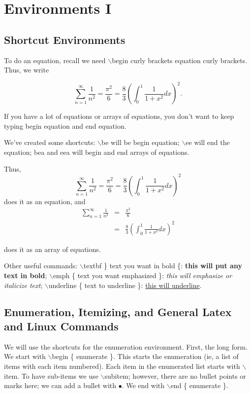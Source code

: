 \documentclass[12pt,reqno]{amsart}
\newcommand\be{\begin{equation}}
\newcommand\ee{\end{equation}}
\newcommand\bea{\begin{eqnarray}}
\newcommand\eea{\end{eqnarray}}
\numberwithin{equation}{section}
\begin{document}
\section{Environments I}

\subsection{Shortcut Environments}

To do an equation, recall we need $\backslash$begin curly brackets
equation curly brackets. Thus, we write

\begin{equation}
\sum_{n=1}^\infty \frac{1}{n^2} = \frac{\pi^2}{6} = \frac{8}{3}
\left(\int_0^1 \frac{1}{1+x^2}dx\right)^2. \end{equation}

If you have a lot of equations or arrays of equations, you don't
want to keep typing begin equation and end equation.

We've created some shortcuts: $\backslash$be will be begin
equation; $\backslash$ee will end the equation; bea and eea will
begin and end arrays of equations.

Thus, \be\sum_{n=1}^\infty \frac{1}{n^2} = \frac{\pi^2}{6} =
\frac{8}{3} \left(\int_0^1 \frac{1}{1+x^2}dx\right)^2  \ee does it
as an equation, and \bea \sum_{n=1}^\infty \frac{1}{n^2} &=&
\frac{\pi^2}{6} \nonumber\\ &=& \frac{8}{3} \left(\int_0^1
\frac{1}{1+x^2}dx\right)^2 \eea

does it as an array of equations.

Other useful commands: $\backslash$textbf \} text you want in bold
\{: \textbf{this will put any text in bold}; $\backslash$emph \{
text you want emphasized \}: \emph{this will emphasize or
italicize text}; $\backslash$underline \{ text to underline \}:
\underline{this will underline}.


\subsection{Enumeration, Itemizing, and General Latex and Linux Commands}

We will use the shortcuts for the enumeration environment. First,
the long form. We start with $\backslash$begin \{ enumerate \}.
This starts the enumeration (ie, a list of items with each item
numbered). Each item in the enumerated list starts with
$\backslash$item. To have sub-items we use $\backslash$subitem;
however, there are no bullet points or marks here; we can add a
bullet with $\bullet$. We end with $\backslash$end \{ enumerate
\}.
\end{document}

